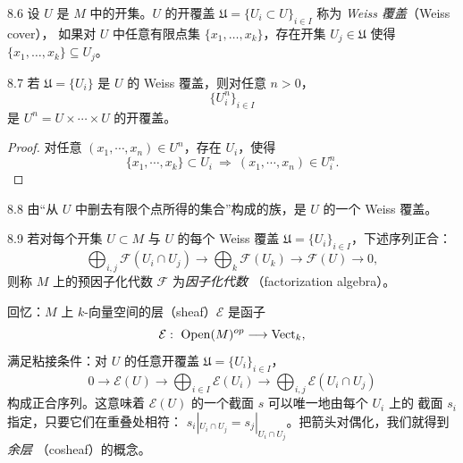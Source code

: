 \begin{wdefn}{8.6}
  设 $U$ 是 $M$ 中的开集。$U$ 的开覆盖
  $\mathfrak{U}=\{U_i\subset U\}_{i\in I}$ 称为 \emph{Weiss 覆盖}（Weiss cover），
  如果对 $U$ 中任意有限点集 $\{x_1,\dots,x_k\}$，存在开集 $U_j\in\mathfrak{U}$
  使得 $\{x_1,\dots,x_k\}\subseteq U_j$。
\end{wdefn}

\begin{wprop}{8.7}
  若 $\mathfrak{U}=\{U_i\}$ 是 $U$ 的 Weiss 覆盖，则对任意 $n>0$，
  \[
    \{U_i^{n}\}_{i\in I}
  \]
  是 $U^{n}=U\times\cdots\times U$ 的开覆盖。
\end{wprop}


\begin{proof}
  对任意 $(x_1,\cdots,x_n)\in U^{n}$，存在 $U_i$，使得
  \[
    \{x_1,\cdots,x_k\}\subset U_i
    \ \Longrightarrow\
    (x_1,\cdots,x_n)\in U_i^{n}.
  \]
\end{proof}


\begin{wexam}{8.8}
  由“从 $U$ 中删去有限个点所得的集合”构成的族，是 $U$ 的一个 Weiss 覆盖。
\end{wexam}

\begin{wdefn}{8.9}
  若对每个开集 $U\subset M$ 与 $U$ 的每个 Weiss 覆盖
  $\mathfrak{U}=\{U_i\}_{i\in I}$，下述序列正合：
  \[
    \bigoplus_{i,j}\mathcal{F}(U_i\cap U_j)
    \longrightarrow
    \bigoplus_{k}\mathcal{F}(U_k)
    \longrightarrow
    \mathcal{F}(U)
    \longrightarrow 0,
  \]
  则称 $M$ 上的预因子化代数 $\mathcal{F}$ 为\emph{因子化代数}
  （factorization algebra）。
\end{wdefn}

回忆：$M$ 上 $k$-向量空间的层（sheaf）$\mathcal{E}$ 是函子
\[
  \mathcal{E}:\ \operatorname{Open}(M)^{op}\longrightarrow \Vect_k,
\]
满足粘接条件：对 $U$ 的任意开覆盖 $\mathfrak{U}=\{U_i\}_{i\in I}$，
\[
  0\longrightarrow\mathcal{E}(U)
  \longrightarrow\bigoplus_{i\in I}\mathcal{E}(U_i)
  \longrightarrow\bigoplus_{i,j}\mathcal{E}(U_i\cap U_j)
\]
构成正合序列。这意味着 $\mathcal{E}(U)$ 的一个截面 $s$ 可以唯一地由每个 $U_i$ 上的
截面 $s_i$ 指定，只要它们在重叠处相符：
$s_i|_{U_i\cap U_j}=s_j|_{U_i\cap U_j}$。把箭头对偶化，我们就得到\emph{余层}
（cosheaf）的概念。

